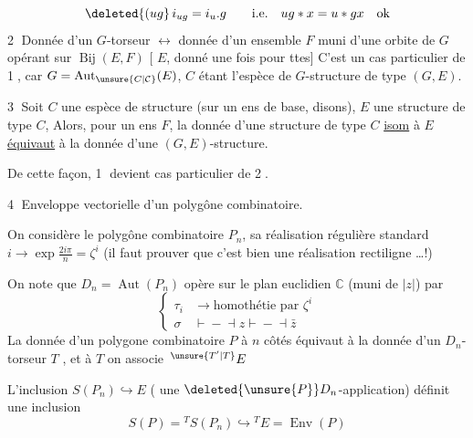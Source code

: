 \[
\deleted{(ug}\,i_{ug}=i_u.g\qquad\text{i.e.}\quad ug*x=u*gx\quad\text{ok}
\]
\textcircled{2} Donnée d'un $G$-torseur  $\longleftrightarrow$ donnée d'un ensemble $F$ muni d'une orbite de $G$ opérant sur $\operatorname{Bij}(E,F)$
[ $E$,   donné une fois pour ttes] C'est un cas particulier de \textcircled{1}, car $G=\operatorname{Aut}_{\unsure{C|\mathcal C}}(E)$, $C$ étant l'espèce de $G$-structure de type $(G,E)$.

\textcircled{3} Soit $C$ une espèce de structure (sur un ens de base, disons), $E$ une structure de type $C$,  Alors, pour un ens $F$, la donnée d'une structure de type $C$ \uline{isom} à $E$ \uline{équivaut} à la donnée d'une $(G,E)$-structure.

De cette façon, \textcircled{1} devient cas particulier de \textcircled{2}.

\textcircled{4} Enveloppe vectorielle d'un polygône combinatoire.

On considère le polygône  combinatoire  \deleted{$\unsure{[1,n]|[1,n[}$\unsure{,}} $P_n$, sa réalisation  régulière standard $i\longrightarrow\exp\frac{2i\pi}{n}=\zeta^i$ (il faut prouver que c'est bien une réalisation rectiligne \ldots !)

On note que $D_n=\operatorname{Aut}(P_n)$ opère sur  le plan euclidien  $\mathbb{C}$ (muni de $|z|$) par 
\[
\left\{\begin{aligned}
\tau_i &\longrightarrow \text{homothétie par }\zeta^i\\
\sigma &\mathrel{\vdash\!\!-\!\dashv} z\mathrel{\vdash\!\!-\!\dashv}\bar z
\end{aligned}\right.
\]
La donnée d'un polygone combinatoire $P$ à $n$ côtés équivaut à la donnée d'un $D_n$-torseur $T$ , et à $T$ on associe $\,{}^{\unsure{T'|T}}E$

L'inclusion $S(P_n)\hookrightarrow E$ ( une $\deleted{\unsure{P}}D_n$-application) définit une inclusion
\[
 S(P)={}^{T}S(P_n)\hookrightarrow{}^{T}E=\operatorname{Env}(P)
\]

